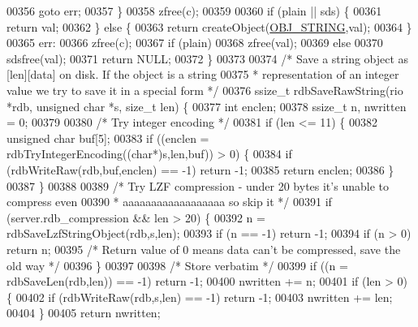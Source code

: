 \begin{DoxyCode}
{{{{{00356         \textcolor{keywordflow}{goto} err;
00357     \}
00358     zfree(c);
00359 
00360     \textcolor{keywordflow}{if} (plain || sds) \{
00361         \textcolor{keywordflow}{return} val;
00362     \} \textcolor{keywordflow}{else} \{
00363         \textcolor{keywordflow}{return} createObject(\hyperlink{server_8h_a65236ea160f69cdef33ec942092af88f}{OBJ\_STRING},val);
00364     \}
00365 err:
00366     zfree(c);
00367     \textcolor{keywordflow}{if} (plain)
00368         zfree(val);
00369     \textcolor{keywordflow}{else}
00370         sdsfree(val);
00371     \textcolor{keywordflow}{return} NULL;
00372 \}
00373 
00374 \textcolor{comment}{/* Save a string object as [len][data] on disk. If the object is a string}
00375 \textcolor{comment}{ * representation of an integer value we try to save it in a special form */}
00376 ssize\_t rdbSaveRawString(rio *rdb, \textcolor{keywordtype}{unsigned} \textcolor{keywordtype}{char} *s, size\_t len) \{
00377     \textcolor{keywordtype}{int} enclen;
00378     ssize\_t n, nwritten = 0;
00379 
00380     \textcolor{comment}{/* Try integer encoding */}
00381     \textcolor{keywordflow}{if} (len <= 11) \{
00382         \textcolor{keywordtype}{unsigned} \textcolor{keywordtype}{char} buf[5];
00383         \textcolor{keywordflow}{if} ((enclen = rdbTryIntegerEncoding((\textcolor{keywordtype}{char}*)s,len,buf)) > 0) \{
00384             \textcolor{keywordflow}{if} (rdbWriteRaw(rdb,buf,enclen) == -1) \textcolor{keywordflow}{return} -1;
00385             \textcolor{keywordflow}{return} enclen;
00386         \}
00387     \}
00388 
00389     \textcolor{comment}{/* Try LZF compression - under 20 bytes it's unable to compress even}
00390 \textcolor{comment}{     * aaaaaaaaaaaaaaaaaa so skip it */}
00391     \textcolor{keywordflow}{if} (server.rdb\_compression && len > 20) \{
00392         n = rdbSaveLzfStringObject(rdb,s,len);
00393         \textcolor{keywordflow}{if} (n == -1) \textcolor{keywordflow}{return} -1;
00394         \textcolor{keywordflow}{if} (n > 0) \textcolor{keywordflow}{return} n;
00395         \textcolor{comment}{/* Return value of 0 means data can't be compressed, save the old way */}
00396     \}
00397 
00398     \textcolor{comment}{/* Store verbatim */}
00399     \textcolor{keywordflow}{if} ((n = rdbSaveLen(rdb,len)) == -1) \textcolor{keywordflow}{return} -1;
00400     nwritten += n;
00401     \textcolor{keywordflow}{if} (len > 0) \{
00402         \textcolor{keywordflow}{if} (rdbWriteRaw(rdb,s,len) == -1) \textcolor{keywordflow}{return} -1;
00403         nwritten += len;
00404     \}
00405     \textcolor{keywordflow}{return} nwritten;
}}}}}
\end{DoxyCode}
